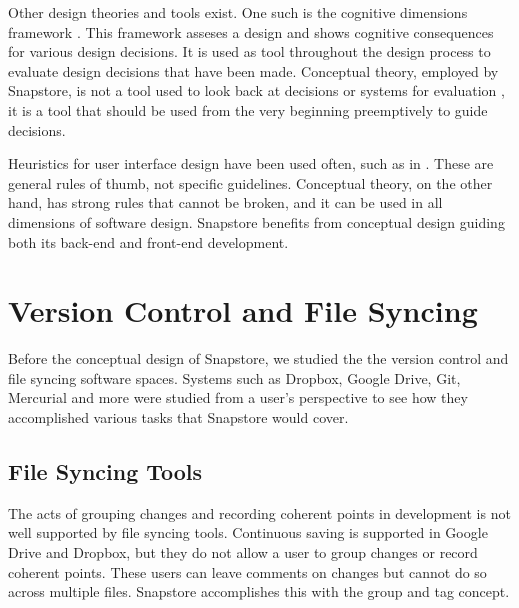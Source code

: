 Other design theories and tools exist. One such is the cognitive dimensions framework \cite{Green}. This framework asseses a design and shows cognitive consequences for various design decisions. It is used as tool throughout the design process to evaluate design decisions that have been made. Conceptual theory, employed by Snapstore, is not a tool used to look back at decisions or systems for evaluation \cite{Jackson}, it is a tool that should be used from the very beginning preemptively to guide decisions.

Heuristics for user interface design have been used often, such as in \cite{Nielsen}. These are general rules of thumb, not specific guidelines. Conceptual theory, on the other hand, has strong rules that cannot be broken, and it can be used in all dimensions of software design. Snapstore benefits from conceptual design guiding both its back-end and front-end development.


\section{Version Control and File Syncing}

Before the conceptual design of Snapstore, we studied the the version control and file syncing software spaces. Systems such as Dropbox, Google Drive, Git, Mercurial and more were studied from a user's perspective to see how they accomplished various tasks that Snapstore would cover.

\subsection{File Syncing Tools}

The acts of grouping changes and recording coherent points in development is not well supported by file syncing tools. Continuous saving is supported in Google Drive and Dropbox, but they do not allow a user to group changes or record coherent points. These users can leave comments on changes but cannot do so across multiple files. Snapstore accomplishes this with the group and tag concept.

